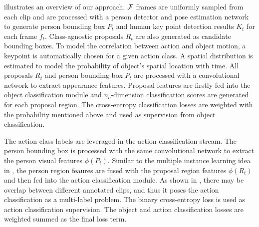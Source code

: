  illustrates an overview of our approach. ${\mathcal F}$ frames are uniformly sampled from each clip and are processed with a person detector and pose estimation network to generate person bounding box $P_t$ and human key point detection results $K_t$ for each frame $f_t$. Class-agnostic proposals $R_t$ are also generated as candidate bounding boxes. To model the correlation between action and object motion, a keypoint is automatically chosen for a given action class. A spatial distribution is estimated to model the probability of object's spatial location with time. All proposals $R_t$ and person bounding box $P_t$ are processed with a convolutional network to extract appearance features. Proposal features are firstly fed into the object classification module and $n_o$-dimension classification scores are generated for each proposal region. The cross-entropy classification losses are weighted with the probability mentioned above and used as supervision from object classification. 

The action class labels are leveraged in the action classification stream. The person bounding box is processed with the same convolutional network to extract the person visual features $\phi(P_t)$. Similar to the multiple instance learning idea in \cite{gkioxari2015contextual}, the person region feaures are fused with the proposal region features $\phi(R_t)$ and then fed into the action classification module. As shown in , there may be overlap between different annotated clips, and thus it poses the action classification as a multi-label problem. The binary cross-entropy loss is used as action classification supervision. The object and action classification losses are weighted summed as the final loss term.

